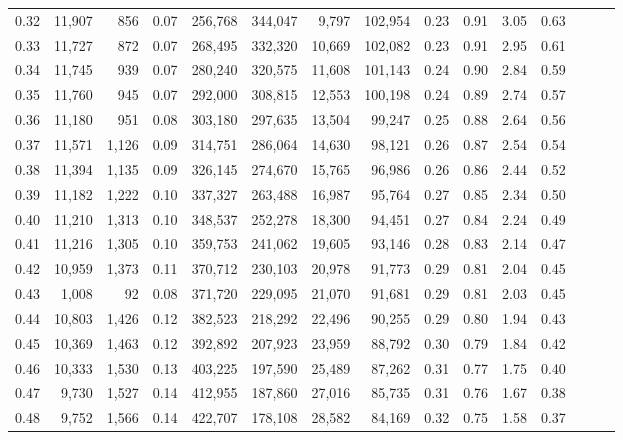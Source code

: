 \begin{tabular}{rrrrrrrrrrrrrrr}
0.32 &  11,907 &    856 &  0.07 &  256,768 &  344,047 &    9,797 &  102,954 &  0.23 &  0.91 &  3.05 &      0.63 \\
0.33 &  11,727 &    872 &  0.07 &  268,495 &  332,320 &   10,669 &  102,082 &  0.23 &  0.91 &  2.95 &      0.61 \\
0.34 &  11,745 &    939 &  0.07 &  280,240 &  320,575 &   11,608 &  101,143 &  0.24 &  0.90 &  2.84 &      0.59 \\
0.35 &  11,760 &    945 &  0.07 &  292,000 &  308,815 &   12,553 &  100,198 &  0.24 &  0.89 &  2.74 &      0.57 \\
0.36 &  11,180 &    951 &  0.08 &  303,180 &  297,635 &   13,504 &   99,247 &  0.25 &  0.88 &  2.64 &      0.56 \\
0.37 &  11,571 &  1,126 &  0.09 &  314,751 &  286,064 &   14,630 &   98,121 &  0.26 &  0.87 &  2.54 &      0.54 \\
0.38 &  11,394 &  1,135 &  0.09 &  326,145 &  274,670 &   15,765 &   96,986 &  0.26 &  0.86 &  2.44 &      0.52 \\
0.39 &  11,182 &  1,222 &  0.10 &  337,327 &  263,488 &   16,987 &   95,764 &  0.27 &  0.85 &  2.34 &      0.50 \\
0.40 &  11,210 &  1,313 &  0.10 &  348,537 &  252,278 &   18,300 &   94,451 &  0.27 &  0.84 &  2.24 &      0.49 \\
0.41 &  11,216 &  1,305 &  0.10 &  359,753 &  241,062 &   19,605 &   93,146 &  0.28 &  0.83 &  2.14 &      0.47 \\
0.42 &  10,959 &  1,373 &  0.11 &  370,712 &  230,103 &   20,978 &   91,773 &  0.29 &  0.81 &  2.04 &      0.45 \\
0.43 &   1,008 &     92 &  0.08 &  371,720 &  229,095 &   21,070 &   91,681 &  0.29 &  0.81 &  2.03 &      0.45 \\
0.44 &  10,803 &  1,426 &  0.12 &  382,523 &  218,292 &   22,496 &   90,255 &  0.29 &  0.80 &  1.94 &      0.43 \\
0.45 &  10,369 &  1,463 &  0.12 &  392,892 &  207,923 &   23,959 &   88,792 &  0.30 &  0.79 &  1.84 &      0.42 \\
0.46 &  10,333 &  1,530 &  0.13 &  403,225 &  197,590 &   25,489 &   87,262 &  0.31 &  0.77 &  1.75 &      0.40 \\
0.47 &   9,730 &  1,527 &  0.14 &  412,955 &  187,860 &   27,016 &   85,735 &  0.31 &  0.76 &  1.67 &      0.38 \\
0.48 &   9,752 &  1,566 &  0.14 &  422,707 &  178,108 &   28,582 &   84,169 &  0.32 &  0.75 &  1.58 &      0.37 \\

\end{tabular}

